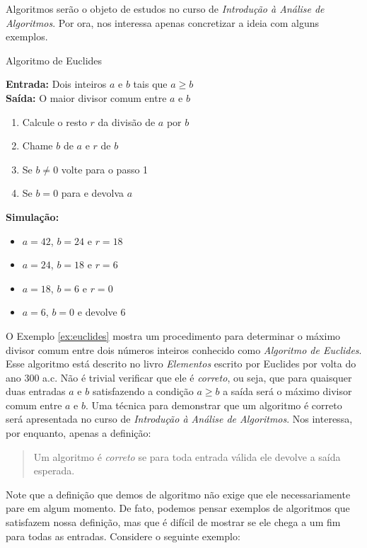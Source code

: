 Algoritmos serão o objeto de estudos no curso de {\em Introdução à Análise de Algoritmos}.
Por ora, nos interessa apenas concretizar a ideia com alguns exemplos.

\begin{example}{Algoritmo de Euclides}
  \label{ex:euclides}

  \noindent
  {\bf Entrada:} Dois inteiros $a$ e $b$ tais que $a \geq b$\\
  {\bf Saída:} O maior divisor comum entre $a$ e $b$
  \begin{enumerate}
  \item Calcule o resto $r$ da divisão de $a$ por $b$
  \item Chame $b$ de $a$ e $r$ de $b$
  \item Se $b \neq 0$ volte para o passo 1
  \item Se $b = 0$ para e devolva $a$
  \end{enumerate}

  \noindent
  {\bf Simulação:}
  \begin{itemize}
  \item $a = 42$, $b = 24$ e $r = 18$
  \item $a = 24$, $b = 18$ e $r = 6$
  \item $a = 18$, $b = 6$ e $r = 0$
  \item $a = 6$, $b = 0$ e devolve $6$
  \end{itemize}
\end{example}

O Exemplo \ref{ex:euclides} mostra um procedimento para determinar o máximo divisor comum entre dois números inteiros conhecido como {\em Algoritmo de Euclides}.
Esse algoritmo está descrito no livro {\em Elementos} escrito por Euclides por volta do ano 300 a.c.
Não é trivial verificar que ele é {\em correto}, ou seja, que para quaisquer duas entradas $a$ e $b$ satisfazendo a condição $a \geq b$ a saída será o máximo divisor comum entre $a$ e $b$.
Uma técnica para demonstrar que um algoritmo é correto será apresentada no curso de {\em Introdução à Análise de Algoritmos}.
Nos interessa, por enquanto, apenas a definição:

\begin{quote}
  Um algoritmo é {\em correto} se para toda entrada válida ele devolve a saída esperada.
\end{quote}

Note que a definição que demos de algoritmo não exige que ele necessariamente pare em algum momento.
De fato, podemos pensar exemplos de algoritmos que satisfazem nossa definição, mas que é difícil de mostrar se ele chega a um fim para todas as entradas.
Considere o seguinte exemplo:


